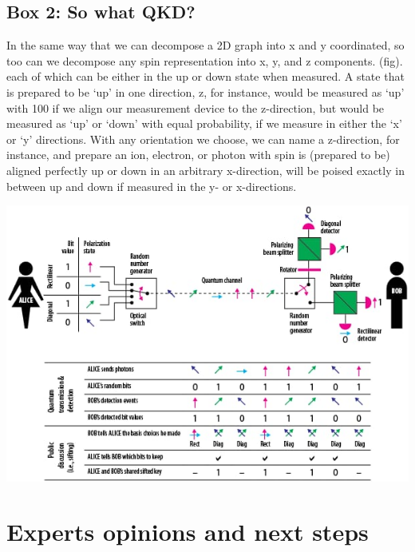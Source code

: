 \documentclass[journal]{vgtc}
\begin{document}
\begin{tcolorbox}
\section{Box 2: So what QKD?}

In the same way that we can decompose a 2D graph into
x and y coordinated, so too can we decompose any spin
representation into x, y, and z components. (fig). each of
which can be either in the up or down state when
measured.
A state that is prepared to be ‘up’ in one direction, z, for
instance, would be measured as ‘up’ with 100%
if we align our measurement device to the z-direction, but
would be measured as ‘up’ or ‘down’ with equal
probability, if we measure in either the ‘x’ or ‘y’ directions.
With any orientation we choose, we can name a
z-direction, for instance, and prepare an ion, electron, or
photon with spin is (prepared to be) aligned perfectly up
or down in an arbitrary x-direction, will be poised exactly in
between up and down if measured in the y- or x-directions.

\includegraphics[width=\linewidth]{Box_2}

\end{tcolorbox}


\section{Experts opinions and next steps}


  

\end{document}
